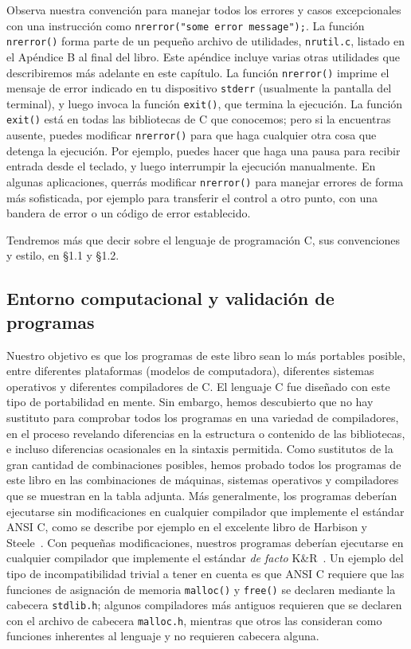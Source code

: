 \documentclass[10pt,a4paper]{book}
\begin{document}
Observa nuestra convención para manejar todos los errores y casos excepcionales con una instrucción como \texttt{nrerror("some error message");}. La función \texttt{nrerror()} forma parte de un pequeño archivo de utilidades, \texttt{nrutil.c}, listado en el Apéndice B al final del libro. Este apéndice incluye varias otras utilidades que describiremos más adelante en este capítulo. La función \texttt{nrerror()} imprime el mensaje de error indicado en tu dispositivo \texttt{stderr} (usualmente la pantalla del terminal), y luego invoca la función \texttt{exit()}, que termina la ejecución. La función \texttt{exit()} está en todas las bibliotecas de C que conocemos; pero si la encuentras ausente, puedes modificar \texttt{nrerror()} para que haga cualquier otra cosa que detenga la ejecución. Por ejemplo, puedes hacer que haga una pausa para recibir entrada desde el teclado, y luego interrumpir la ejecución manualmente. En algunas aplicaciones, querrás modificar \texttt{nrerror()} para manejar errores de forma más sofisticada, por ejemplo para transferir el control a otro punto, con una bandera de error o un código de error establecido.

\medskip

Tendremos más que decir sobre el lenguaje de programación C, sus convenciones y estilo, en \S1.1 y \S1.2.

\subsection{Entorno computacional y validación de programas}

Nuestro objetivo es que los programas de este libro sean lo más portables posible, entre diferentes plataformas (modelos de computadora), diferentes sistemas operativos y diferentes compiladores de C. El lenguaje C fue diseñado con este tipo de portabilidad en mente. Sin embargo, hemos descubierto que no hay sustituto para comprobar todos los programas en una variedad de compiladores, en el proceso revelando diferencias en la estructura o contenido de las bibliotecas, e incluso diferencias ocasionales en la sintaxis permitida. Como sustitutos de la gran cantidad de combinaciones posibles, hemos probado todos los programas de este libro en las combinaciones de máquinas, sistemas operativos y compiladores que se muestran en la tabla adjunta. Más generalmente, los programas deberían ejecutarse sin modificaciones en cualquier compilador que implemente el estándar ANSI C, como se describe por ejemplo en el excelente libro de Harbison y Steele~\cite{harbison}. Con pequeñas modificaciones, nuestros programas deberían ejecutarse en cualquier compilador que implemente el estándar \textit{de facto} K\&R~\cite{kr_standard}. Un ejemplo del tipo de incompatibilidad trivial a tener en cuenta es que ANSI C requiere que las funciones de asignación de memoria \texttt{malloc()} y \texttt{free()} se declaren mediante la cabecera \texttt{stdlib.h}; algunos compiladores más antiguos requieren que se declaren con el archivo de cabecera \texttt{malloc.h}, mientras que otros las consideran como funciones inherentes al lenguaje y no requieren cabecera alguna.
\end{document}
